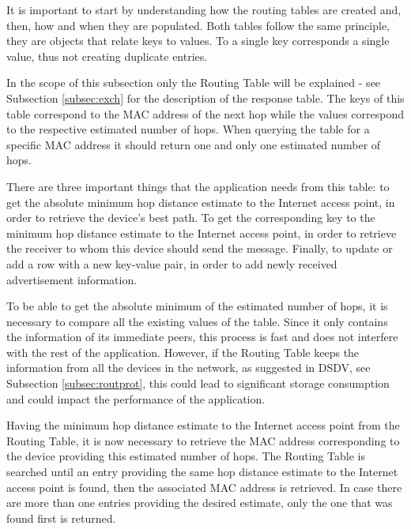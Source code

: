 It is important to start by understanding how the routing tables are created and, then, how and when they are populated. Both tables follow the same principle, they are objects that relate keys to values. To a single key corresponds a single value, thus not creating duplicate entries.

In the scope of this subsection only the Routing Table will be explained - see Subsection \ref{subsec:exch} for the description of the response table. The keys of this table correspond to the \gls{MAC} address of the next hop while the values correspond to the respective estimated number of hops. When querying the table for a specific \gls{MAC} address it should return one and only one estimated number of hops.

There are three important things that the application needs from this table: to get the absolute minimum hop distance estimate to the Internet access point, in order to retrieve the device's best path. To get the corresponding key to the minimum hop distance estimate to the Internet access point, in order to retrieve the receiver to whom this device should send the message. Finally, to update or add a row with a new key-value pair, in order to add newly received advertisement information.

To be able to get the absolute minimum of the estimated number of hops, it is necessary to compare all the existing values of the table. Since it only contains the information of its immediate peers, this process is fast and does not interfere with the rest of the application. However, if the Routing Table keeps the information from all the devices in the network, as suggested in \gls{DSDV}, see Subsection \ref{subsec:routprot}, this could lead to significant storage consumption and could impact the performance of the application.

Having the minimum hop distance estimate to the Internet access point from the Routing Table, it is now necessary to retrieve the \gls{MAC} address corresponding to the device providing this estimated number of hops. The Routing Table is searched until an entry providing the same hop distance estimate to the Internet access point is found, then the associated \gls{MAC} address is retrieved. In case there are more than one entries providing the desired estimate, only the one that was found first is returned.


